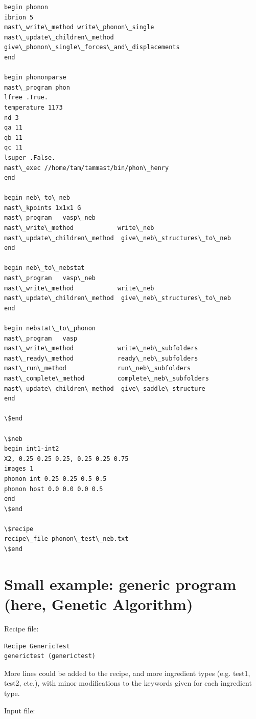 \documentclass[letterpaper,10pt,english]{sphinxmanual}
\begin{document}
\begin{Verbatim}[commandchars=\\\{\}]
begin phonon
ibrion 5
mast\_write\_method write\_phonon\_single
mast\_update\_children\_method give\_phonon\_single\_forces\_and\_displacements
end

begin phononparse
mast\_program phon
lfree .True.
temperature 1173
nd 3
qa 11
qb 11
qc 11
lsuper .False.
mast\_exec //home/tam/tammast/bin/phon\_henry
end

begin neb\_to\_neb
mast\_kpoints 1x1x1 G
mast\_program   vasp\_neb
mast\_write\_method            write\_neb
mast\_update\_children\_method  give\_neb\_structures\_to\_neb
end

begin neb\_to\_nebstat
mast\_program   vasp\_neb
mast\_write\_method            write\_neb
mast\_update\_children\_method  give\_neb\_structures\_to\_neb
end

begin nebstat\_to\_phonon
mast\_program   vasp
mast\_write\_method            write\_neb\_subfolders
mast\_ready\_method            ready\_neb\_subfolders
mast\_run\_method              run\_neb\_subfolders
mast\_complete\_method         complete\_neb\_subfolders
mast\_update\_children\_method  give\_saddle\_structure
end

\$end

\$neb
begin int1-int2
X2, 0.25 0.25 0.25, 0.25 0.25 0.75
images 1
phonon int 0.25 0.25 0.5 0.5
phonon host 0.0 0.0 0.0 0.5
end
\$end

\$recipe
recipe\_file phonon\_test\_neb.txt
\$end
\end{Verbatim}


\section{Small example: generic program (here, Genetic Algorithm)}
\label{9_0_examples:small-example-generic-program-here-genetic-algorithm}
Recipe file:

\begin{Verbatim}[commandchars=\\\{\}]
Recipe GenericTest
generictest (generictest)
\end{Verbatim}

More lines could be added to the recipe, and more ingredient types (e.g. test1, test2, etc.), with minor modifications to the keywords given for each ingredient type.

Input file:
\end{document}
